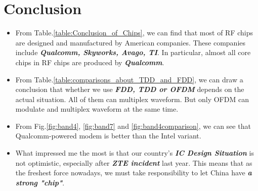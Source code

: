 \documentclass[conference]{IEEEtran}
\begin{document}
\section{Conclusion}\label{sec:conclusion}
\begin{itemize}
	\item From Table.\ref{table:Conclusion_of_Chips}, we can find that most of RF chips are designed and manufactured by American companies. These companies include {\bfseries{\emph{Qualcomm, Skyworks, Avago, TI}}}. In particular, almost all core chips in RF chips are produced by {\bfseries{\emph{Qualcomm}}}.
	\item From Table.\ref{table:comparisons_about_TDD_and_FDD}, we can draw a conclusion that whether we use {\bfseries{\emph{FDD, TDD or OFDM}}} depends on the actual situation. All of them can multiplex waveform. But only OFDM can modulate and multiplex waveform at the same time.
	\item From Fig.\ref{fig:band4}, \ref{fig:band7} and \ref{fig:band4comparison}, we can see that Qualcomm-powered modem is better than the Intel variant.
	\item What impressed me the most is that our country's {\bfseries{\emph{IC Design Situation}}} is not optimistic, especially after {\bfseries{\emph{ZTE incident}}} last year. This means that as the freshest force nowadays, we must take responsibility to let China have {\bfseries{\emph{a strong "chip"}}}.	  
\end{itemize}






\end{document}
